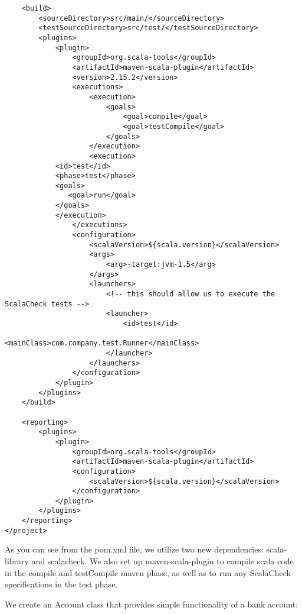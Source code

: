 \documentclass{article}
\begin{document}
\begin{lstlisting}
    <build>
        <sourceDirectory>src/main/</sourceDirectory>
        <testSourceDirectory>src/test/</testSourceDirectory>
        <plugins>
            <plugin>
                <groupId>org.scala-tools</groupId>
                <artifactId>maven-scala-plugin</artifactId>
                <version>2.15.2</version>
                <executions>
                    <execution>
                        <goals>
                            <goal>compile</goal>
                            <goal>testCompile</goal>
                        </goals>
                    </execution>
                    <execution>
			<id>test</id>
			<phase>test</phase>
			<goals>
			   <goal>run</goal>
			</goals>
		    </execution>
                </executions>
                <configuration>
                    <scalaVersion>${scala.version}</scalaVersion>
                    <args>
                        <arg>-target:jvm-1.5</arg>
                    </args>
                    <launchers>
                        <!-- this should allow us to execute the ScalaCheck tests -->
                        <launcher>
                            <id>test</id>
                            <mainClass>com.company.test.Runner</mainClass>
                        </launcher>
                    </launchers>
                </configuration>
            </plugin>
        </plugins>
    </build>

    <reporting>
        <plugins>
            <plugin>
                <groupId>org.scala-tools</groupId>
                <artifactId>maven-scala-plugin</artifactId>
                <configuration>
                    <scalaVersion>${scala.version}</scalaVersion>
                </configuration>
            </plugin>
        </plugins>
    </reporting>
</project>
\end{lstlisting}

As you can see from the pom.xml file, we utilize two new dependencies:
scala-library and scalacheck. We also set up maven-scala-plugin to
compile scala code in the compile and testCompile maven phase, as well
as to run any ScalaCheck specifications in the test phase.

We create an Account class that provides simple functionality of a
bank account:
\end{document}
